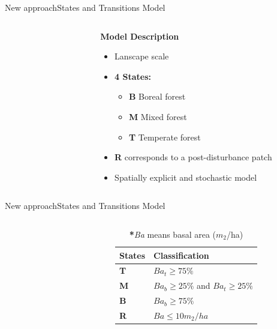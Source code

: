 \documentclass[10pt,aspectratio=149]{beamer}
\begin{document}
\begin{frame}{New approach}{States and Transitions Model}

\begin{columns}[c]
	\begin{column}[c]{.40\paperwidth}
		\begin{figure}
			\small{}
		\end{figure}
	\end{column}
	\begin{column}[l]{.50\paperwidth}
	\textbf{Model Description}
		\begin{itemize}
			\item Lanscape scale
			\item \textbf{4 States:}
			\begin{itemize}
				\item \textbf{B} Boreal forest
				\item \textbf{M} Mixed forest
				\item \textbf{T} Temperate forest
			\end{itemize}
			\item \textbf{R} corresponds to a post-disturbance patch
			\item Spatially explicit and stochastic model
		\end{itemize}
	\end{column}
\end{columns}
\end{frame}


\begin{frame}{New approach}{States and Transitions Model}

\begin{columns}[c]
	\begin{column}[c]{.40\paperwidth}
		\begin{figure}
			\small{}
		\end{figure}
	\end{column}
	\begin{column}[l]{.50\paperwidth}
	\begin{table}
		\begin{tabular}{|l|l|}
			\hline
			\textbf{States}  & \textbf{Classification}\\
			\hline
			\textbf{T} & $Ba_t \geq 75\%$    \\
			\textbf{M} & $Ba_b \geq 25\%$ and $Ba_t \geq 25\%$ \\
			\textbf{B} & $Ba_b \geq 75\%$   \\
			\textbf{R} & $Ba  \leq 10m_2/ha $ \\ 			\hline 
		\end{tabular}
			\caption{ \textbf{*}\textit{Ba} means basal area ($m_{2}$/ha)}
		\end{table}
	\end{column}
\end{columns}

\end{frame}
\end{document}

